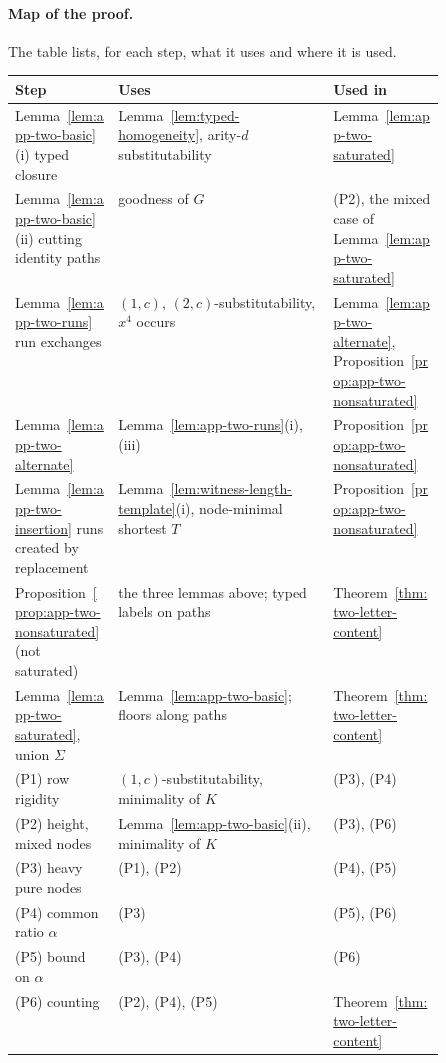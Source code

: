 \paragraph{Map of the proof.}
The table lists, for each step, what it uses and where it is used.
\begin{center}
\footnotesize
\setlength{\tabcolsep}{3pt}
\renewcommand{\arraystretch}{1.15}
\begin{tabularx}{\linewidth}{@{}>{\raggedright\arraybackslash}p{0.24\linewidth}>{\raggedright\arraybackslash}X>{\raggedright\arraybackslash}p{0.26\linewidth}@{}}
\hline
Step & Uses & Used in\\
\hline
Lemma~\ref{lem:app-two-basic}(i) typed closure
 & Lemma~\ref{lem:typed-homogeneity}, arity-$d$ substitutability
 & Lemma~\ref{lem:app-two-saturated}\\
Lemma~\ref{lem:app-two-basic}(ii) cutting identity paths
 & goodness of $G$
 & (P2), the mixed case of Lemma~\ref{lem:app-two-saturated}\\
Lemma~\ref{lem:app-two-runs} run exchanges
 & $(1,c)$, $(2,c)$-substitutability, $x^4$ occurs
 & Lemma~\ref{lem:app-two-alternate}, Proposition~\ref{prop:app-two-nonsaturated}\\
Lemma~\ref{lem:app-two-alternate}
 & Lemma~\ref{lem:app-two-runs}(i),(iii)
 & Proposition~\ref{prop:app-two-nonsaturated}\\
Lemma~\ref{lem:app-two-insertion} runs created by replacement
 & Lemma~\ref{lem:witness-length-template}(i), node-minimal shortest $T$
 & Proposition~\ref{prop:app-two-nonsaturated}\\
Proposition~\ref{prop:app-two-nonsaturated} (not saturated)
 & the three lemmas above; typed labels on paths
 & Theorem~\ref{thm:two-letter-content}\\
Lemma~\ref{lem:app-two-saturated}, union $\Sigma$
 & Lemma~\ref{lem:app-two-basic}; floors along paths
 & Theorem~\ref{thm:two-letter-content}\\
(P1) row rigidity
 & $(1,c)$-substitutability, minimality of $K$
 & (P3), (P4)\\
(P2) height, mixed nodes
 & Lemma~\ref{lem:app-two-basic}(ii), minimality of $K$
 & (P3), (P6)\\
(P3) heavy pure nodes
 & (P1), (P2)
 & (P4), (P5)\\
(P4) common ratio $\alpha$
 & (P3)
 & (P5), (P6)\\
(P5) bound on $\alpha$
 & (P3), (P4)
 & (P6)\\
(P6) counting
 & (P2), (P4), (P5)
 & Theorem~\ref{thm:two-letter-content}\\
\hline
\end{tabularx}
\end{center}

